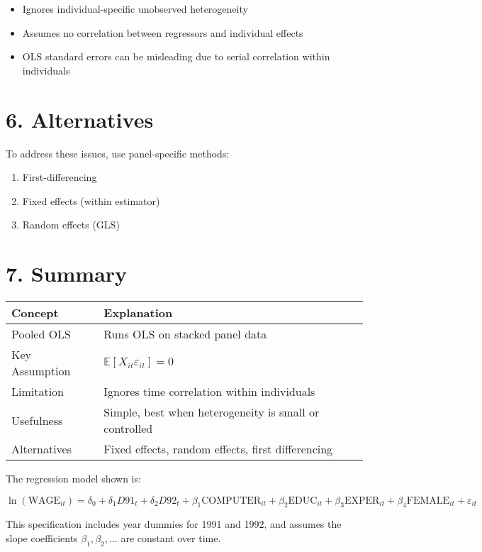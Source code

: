\documentclass[12pt, oneside]{article}
\begin{document}
\begin{itemize}
  \item Ignores individual-specific unobserved heterogeneity
  \item Assumes no correlation between regressors and individual effects
  \item OLS standard errors can be misleading due to serial correlation within individuals
\end{itemize}

\section*{6. Alternatives}

To address these issues, use panel-specific methods:
\begin{enumerate}
  \item First-differencing
  \item Fixed effects (within estimator)
  \item Random effects (GLS)
\end{enumerate}

\section*{7. Summary}

\begin{tabular}{@{}ll@{}}
\toprule
\textbf{Concept} & \textbf{Explanation} \\
\midrule
Pooled OLS & Runs OLS on stacked panel data \\
Key Assumption & \( \mathbb{E}[X_{it} \varepsilon_{it}] = 0 \) \\
Limitation & Ignores time correlation within individuals \\
Usefulness & Simple, best when heterogeneity is small or controlled \\
Alternatives & Fixed effects, random effects, first differencing \\
\bottomrule
\end{tabular}

The regression model shown is:

\[
\ln(\text{WAGE}_{it}) = \delta_0 + \delta_1 D91_t + \delta_2 D92_t + \beta_1 \text{COMPUTER}_{it} + \beta_2 \text{EDUC}_{it} + \beta_3 \text{EXPER}_{it} + \beta_4 \text{FEMALE}_{it} + \varepsilon_{it}
\]

This specification includes year dummies for 1991 and 1992, and assumes the slope coefficients \( \beta_1, \beta_2, \ldots \) are constant over time.
\end{document}
